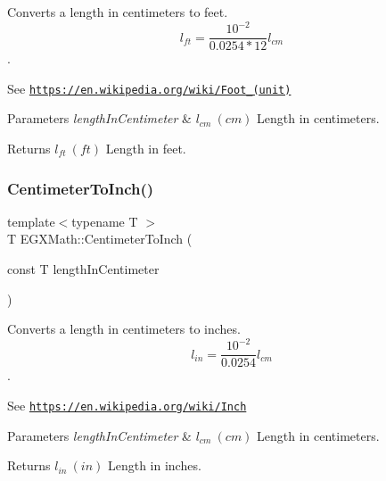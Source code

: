 Converts a length in centimeters to feet. \[ l_{ft}= \frac{10^{-2}}{0.0254 * 12} l_{cm} \]. 

See \href{https://en.wikipedia.org/wiki/Foot_(unit)}{\tt https\+://en.\+wikipedia.\+org/wiki/\+Foot\+\_\+(unit)} 
\begin{DoxyParams}{Parameters}
{\em length\+In\+Centimeter} & $ l_{cm}\ (cm)$ Length in centimeters. \\
\hline
\end{DoxyParams}
\begin{DoxyReturn}{Returns}
$ l_{ft}\ (ft)$ Length in feet. 
\end{DoxyReturn}
\mbox{\label{group___e_g_x_math-_conversions-_length_conversions-_centimeter-_imperial_ga9d90fd3e24ac92c43f57db3e27a24507}} 
\subsubsection{\texorpdfstring{Centimeter\+To\+Inch()}{CentimeterToInch()}}
{\footnotesize\ttfamily template$<$typename T $>$ \\
T E\+G\+X\+Math\+::\+Centimeter\+To\+Inch (\begin{DoxyParamCaption}\item[{const T}]{length\+In\+Centimeter }\end{DoxyParamCaption})}



Converts a length in centimeters to inches. \[ l_{in}= \frac{10^{-2}}{0.0254} l_{cm} \]. 

See \href{https://en.wikipedia.org/wiki/Inch}{\tt https\+://en.\+wikipedia.\+org/wiki/\+Inch} 
\begin{DoxyParams}{Parameters}
{\em length\+In\+Centimeter} & $ l_{cm}\ (cm)$ Length in centimeters. \\
\hline
\end{DoxyParams}
\begin{DoxyReturn}{Returns}
$ l_{in}\ (in)$ Length in inches. 
\end{DoxyReturn}
\mbox{\label{group___e_g_x_math-_conversions-_length_conversions-_centimeter-_imperial_ga4d32adb63d2c5ac44ce1f7a0ba746452}} 
